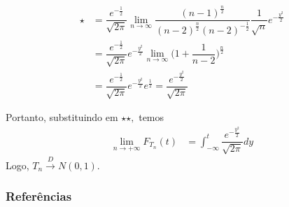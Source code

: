 \documentclass[12pt]{beamer}
\begin{document}
\begin{frame}{}
\begin{block}{}
\justifying
\begin{align*}
    \star&=\dfrac{e^{-\frac{1}{2}}}{\sqrt{2\pi}}{\displaystyle \lim_{n\rightarrow\infty}\dfrac{(n-1)^{\frac{n}{2}}}{(n-2)^{\frac{n}{2}}(n-2)^{-\frac{1}{2}}}}\dfrac{1}{\sqrt{n}}e^{-\frac{y^{2}}{2}}\\
    &=\dfrac{e^{-\frac{1}{2}}}{\sqrt{2\pi}}e^{-\frac{y^{2}}{2}}{\displaystyle \lim_{n\rightarrow\infty}\Big(1+\dfrac{1}{n-2}\Big)^{\frac{n}{2}}}\\
    &=\dfrac{e^{-\frac{1}{2}}}{\sqrt{2\pi}}e^{-\frac{y^{2}}{2}}e^{\frac{1}{2}}=\dfrac{e^{-\frac{y^{2}}{2}}}{\sqrt{2\pi}}
\end{align*}
\end{block}
\pause
\begin{block}{}
\justifying
Portanto, substituindo em $\star\star,$ temos 
\begin{align*}
\lim_{n\rightarrow+\infty}F_{T_{n}}(t)&=\int_{-\infty}^{t}\dfrac{e^{-\frac{y^{2}}{2}}}{\sqrt{2\pi}}dy
\end{align*}
Logo, $T_{n} \overset{D}{\rightarrow} N(0,1).$
\nocite{hogg}
\end{block}
\end{frame}



\begin{frame}[allowframebreaks]
\frametitle{\bf Referências}
\printbibliography
\end{frame}
\end{document}

